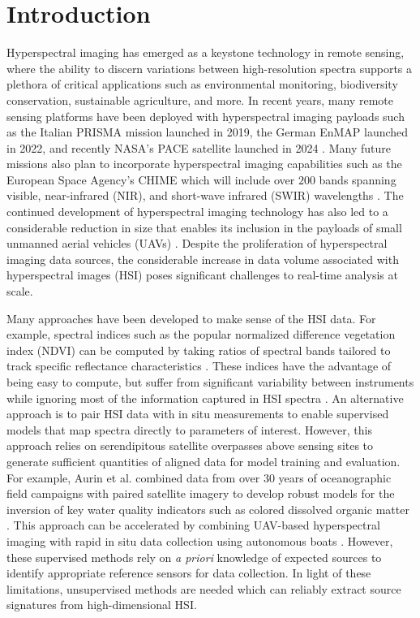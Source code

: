 \documentclass[remotesensing,article,submit,pdftex,moreauthors]{Definitions/mdpi}
\begin{document}

\section{Introduction}


Hyperspectral imaging has emerged as a keystone technology in remote sensing, where the ability to discern variations between high-resolution spectra supports a plethora of critical applications such as environmental monitoring, biodiversity conservation, sustainable agriculture, and more. In recent years, many remote sensing platforms have been deployed with hyperspectral imaging payloads such as the Italian PRISMA mission launched in 2019, the German EnMAP launched in 2022, and recently NASA's PACE satellite launched in 2024 \cite{PRISMA-orig, EnMAP-orig, PACE-orig}. Many future missions also plan to incorporate hyperspectral imaging capabilities such as the European Space Agency's CHIME which will include over $200$ bands spanning visible, near-infrared (NIR), and short-wave infrared (SWIR) wavelengths \cite{CHIME-orig}. The continued development of hyperspectral imaging technology has also led to a considerable reduction in size that enables its inclusion in the payloads of small unmanned aerial vehicles (UAVs) \cite{adao2017hyperspectral, arroyo2019implementation}. Despite the proliferation of hyperspectral imaging data sources, the considerable increase in data volume associated with hyperspectral images (HSI) poses significant challenges to real-time analysis at scale.

Many approaches have been developed to make sense of the HSI data. For example, spectral indices such as the popular normalized difference vegetation index (NDVI) can be computed by taking ratios of spectral bands tailored to track specific reflectance characteristics \cite{thenkabail-indices,thenkabail2018hyperspectral}. These indices have the advantage of being easy to compute, but suffer from significant variability between instruments while ignoring most of the information captured in HSI spectra \cite{ndvi-variability}. An alternative approach is to pair HSI data with in situ measurements to enable supervised models that map spectra directly to parameters of interest. However, this approach relies on serendipitous satellite overpasses above sensing sites to generate sufficient quantities of aligned data for model training and evaluation. For example, Aurin et al. combined data from over 30 years of oceanographic field campaigns with paired satellite imagery to develop robust models for the inversion of key water quality indicators such as colored dissolved organic matter \cite{aurin2018remote}. This approach can be accelerated by combining UAV-based hyperspectral imaging with rapid in situ data collection using autonomous boats \cite{robot-team-1, robot-team-2}. However, these supervised methods rely on \textit{a priori} knowledge of expected sources to identify appropriate reference sensors for data collection. In light of these limitations, unsupervised methods are needed which can reliably extract source signatures from high-dimensional HSI.
\end{document}
